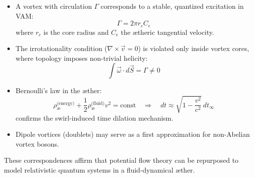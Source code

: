         \begin{itemize}
            \item A vortex with circulation \(\Gamma\) corresponds to a stable, quantized excitation in VAM:
            \[
                \Gamma = 2\pi r_c C_e
            \]
            where \(r_c\) is the core radius and \(C_e\) the ætheric tangential velocity.

            \item The irrotationality condition (\(\nabla \times \vec{v} = 0\)) is violated only inside vortex cores, where topology imposes non-trivial helicity:
            \[
                \int \vec{\omega} \cdot d\vec{S} = \Gamma \neq 0
            \]

            \item Bernoulli’s law in the æther:
            \[
                \rho_\text{\ae}^{\text{(energy)}} + \frac{1}{2} \rho_\text{\ae}^{\text{(fluid)}} v^2 = \text{const}
                \quad \Rightarrow \quad dt \approx \sqrt{1 - \frac{v^2}{c^2}}\,dt_\infty
            \]
            confirms the swirl-induced time dilation mechanism.

            \item Dipole vortices (doublets) may serve as a first approximation for non-Abelian vortex bosons.
        \end{itemize}
        These correspondences affirm that potential flow theory can be repurposed to model relativistic quantum systems in a fluid-dynamical æther.